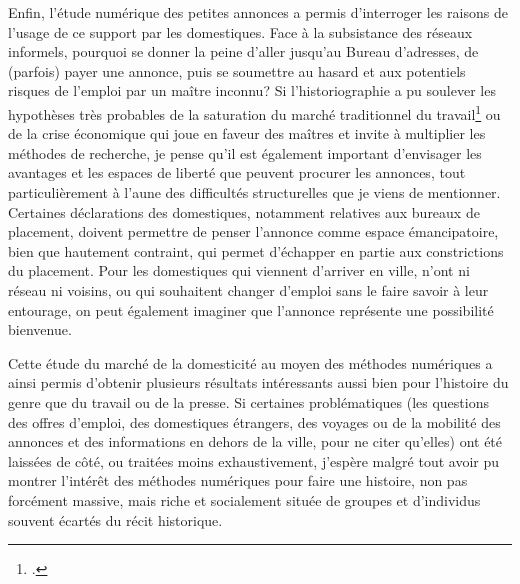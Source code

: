 Enfin, l'étude numérique des petites annonces a permis d'interroger les raisons de l'usage de ce support par les domestiques. Face à la subsistance des réseaux informels, pourquoi se donner la peine d'aller jusqu'au Bureau d'adresses, de (parfois) payer une annonce, puis se soumettre au hasard et aux potentiels risques de l'emploi par un maître inconnu? Si l'historiographie a pu soulever les hypothèses très probables de la saturation du marché traditionnel du travail\footcites{pasleauAnnoncesEmploiLiege2002}{sarasuaCriadosNodrizasAmos1994} ou de la crise économique qui joue en faveur des maîtres et invite à multiplier les méthodes de recherche, je pense qu'il est également important d'envisager les avantages et les espaces de liberté que peuvent procurer les annonces, tout particulièrement à l'aune des difficultés structurelles que je viens de mentionner. Certaines déclarations des domestiques, notamment relatives aux bureaux de placement, doivent permettre de penser l'annonce comme espace émancipatoire, bien que hautement contraint, qui permet d'échapper en partie aux constrictions du placement. Pour les domestiques qui viennent d'arriver en ville, n'ont ni réseau ni voisins, ou qui souhaitent changer d'emploi sans le faire savoir à leur entourage, on peut également imaginer que l'annonce représente une possibilité bienvenue.
 
Cette étude du marché de la domesticité au moyen des méthodes numériques a ainsi permis d'obtenir plusieurs résultats intéressants aussi bien pour l'histoire du genre que du travail ou de la presse. Si certaines problématiques (les questions des offres d'emploi, des domestiques étrangers, des voyages ou de la mobilité des annonces et des informations en dehors de la ville, pour ne citer qu'elles) ont été laissées de côté, ou traitées moins exhaustivement, j'espère malgré tout avoir pu montrer l'intérêt des méthodes numériques pour faire une histoire, non pas forcément massive, mais riche et socialement située de groupes et d'individus souvent écartés du récit historique. 




 